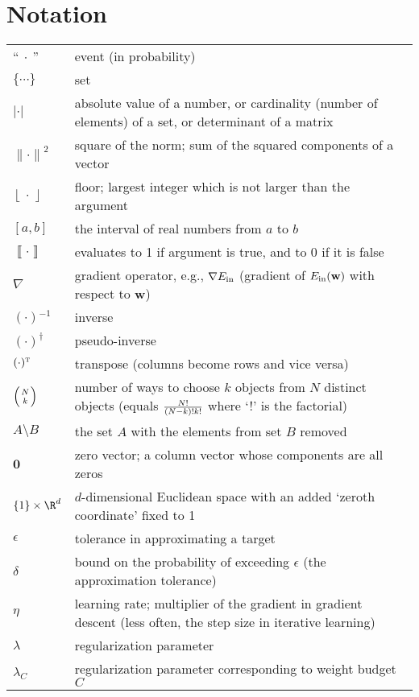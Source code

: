 \documentclass[10pt]{book}
\begin{document}
\chapter*{Notation}
\begin{longtable}{lp{4.5in}}
``$\ \cdot \ $'' & event (in probability)\\
$\{ \cdots \}$ & set\\
$| \cdot{} |$& absolute value of a number, or cardinality (number of elements) of a set, or determinant of a matrix\\
${\|\cdot\|}^2$& square of the norm; sum of the squared components of a vector\\
${\left\lfloor\,\cdot\,\right\rfloor}$ & floor; largest integer which is not larger than the argument
\\ 
$[a,b]$ & the interval of real numbers from $a$ to $b$\\
${\left\llbracket\cdot\right\rrbracket}$ & evaluates to 1 if argument is true, and to 0 if it is false\\
$\nabla$ & gradient operator, e.g., $\nabla{E_{\textrm{\textup{in}}}}$ (gradient of ${E_{\textrm{\textup{in}}}}({{\mathbf{w}}})$ with respect to ${{\mathbf{w}}}$) \\
$(\cdot){^{-1}}$& inverse\\
$(\cdot)^{\dagger}$ & pseudo-inverse\\
$(\cdot){^{\text{\textsc{t}}}}$ & transpose (columns become rows and vice versa)\\
$\left({{N}\atop{k}}\right)$ & number of ways to choose $k$ objects from $N$ distinct objects (equals ${N! \over {(N-k)! k!}}$ where `!' is the factorial)\\
$A\setminus B$ & the set $A$ with the elements
from set $B$ removed\\
$\mathbf{0}$& zero vector; a column vector whose components are all zeros\\
$\{1\}\times\R^d$& $d$-dimensional Euclidean space with an added 
`zeroth coordinate' fixed to 1\\
$\epsilon$& tolerance in approximating a target\\
$\delta$& bound on the probability of exceeding $\epsilon$ (the approximation tolerance)\\
$\eta$ & learning rate; multiplier of the gradient in gradient descent
(less often, the step size in iterative learning)\\
${\lambda}$ & regularization parameter\\
${\lambda}_C$ & regularization parameter corresponding to weight budget $C$\\

\end{longtable}
\end{document}
